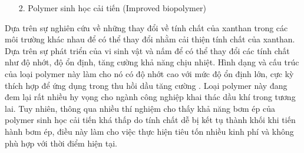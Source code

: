 \documentclass[12pt,a4paper]{article}
\begin{document}
		\begin{enumerate}
			\item[2.] Polymer sinh học cải tiến (Improved biopolymer)
		\end{enumerate}
	Dựa trên sự nghiên cứu về những thay đổi về tính chất của xanthan trong các môi trường khác nhau để có thể thay đổi nhằm cải thiện tính chất của xanthan. Dựa trên sự phát triển của vi sinh vật và nấm để có thể thay đổi các tính chất như độ nhớt, độ ổn định, tăng cường khả năng chịu nhiệt. Hình dạng và cấu trúc của loại polymer này làm cho nó có độ nhớt cao với mức độ ổn định lớn, cực kỳ thích hợp để ứng dụng trong thu hồi dầu tăng cường \cite{sorbie2013polymer}. Loại polymer này đang đem lại rất nhiều hy vọng cho ngành công nghiệp khai thác dầu khí trong tương lai. Tuy nhiên, thông qua nhiều thí nghiệm cho thấy khả năng bơm ép của polymer sinh học cải tiến khá thấp do tính chất dễ bị kết tụ thành khối khi tiến hành bơm ép, điều này làm cho việc thực hiện tiêu tốn nhiều kinh phí và không phù hợp với thời điểm hiện tại.
	\newpage
\end{document}
